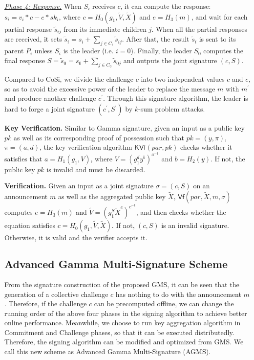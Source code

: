 \documentclass[journal]{IEEEtran}
\begin{document}
\noindent\emph{\underline{Phase 4: Response.}} When \(S_i\) receives \(c\), it can compute the response: \(s_i=v_i*c-e*sk_i\), where \(c= H_0(g_1,\tilde{V},\tilde{X})\) and \(e=H_3(m)\), and wait for each partial response \(\tilde{s}_{ij}\) from its immediate children \(j\). When all the partial responses are received, it sets \(\tilde{s}_i= s_i+\sum_{j\in C_i}{\tilde{s}_{ij}}\). After that, the result \(\tilde{s}_i\) is sent to its parent \(P_i\) unless \(S_i\) is the leader (i.e. \(i=0\)). Finally, the leader \(S_0\) computes the final response \(S= \tilde{s}_0=s_0+\sum_{j\in C_0}{\tilde{s}_{0j}}\) and outputs the joint signature \((c,S)\).

Compared to CoSi, we divide the challenge \(c\) into two independent values \(c\) and \(e\), so as to avoid the excessive power of the leader to replace the message \(m\) with \(m^\prime\) and produce another challenge \(c^\prime\). Through this signature algorithm, the leader is hard to forge a joint signature \((c^\prime,S^\prime)\) by \(k\)-sum problem attacks.

\noindent\textbf{Key Verification.} Similar to Gamma signature, given an input as a public key \(pk\) as well as its corresponding proof of possession such that \(pk=(y,\pi)\), \(\pi=(a,d)\), the key verification algorithm \(\textsf{KVf}(par, pk)\) checks whether it satisfies that \(a=H_1(g_1,V)\), where \(V= (g_1^d y^b)^{a^{-1}}\)  and \(b= H_2(y)\). If not, the public key \(pk\) is invalid and must be discarded.

\noindent\textbf{Verification.} Given an input as a joint signature \(\sigma= (c,S)\) on an announcement \(m\) as well as the aggregated public key \(\tilde{X}\), \(\textsf{Vf}(par,\tilde{X},m,\sigma)\) computes \(e=H_3(m)\) and \(\tilde{V}=(g_1^S \tilde{X}^{e})^{c^{-1}}\), and then checks whether the equation satisfies \(c=H_0(g_1,\tilde{V},\tilde{X})\). If not, \((c,S)\) is an invalid signature. Otherwise, it is valid and the verifier accepts it.

\subsection{Advanced Gamma Multi-Signature Scheme}
From the signature construction of the proposed GMS, it can be seen that the generation of a collective challenge \(c\) has nothing to do with the announcement \(m\). Therefore, if the challenge \(c\) can be precomputed offline, we can change the running order of the above four phases in the signing algorithm to achieve better online performance. Meanwhile, we choose to run key aggregation algorithm in Commitment and Challenge phases, so that it can be executed distributedly. Therefore, the signing algorithm can be modified and optimized from GMS. We call this new scheme as Advanced Gamma Multi-Signature (AGMS).
\end{document}
